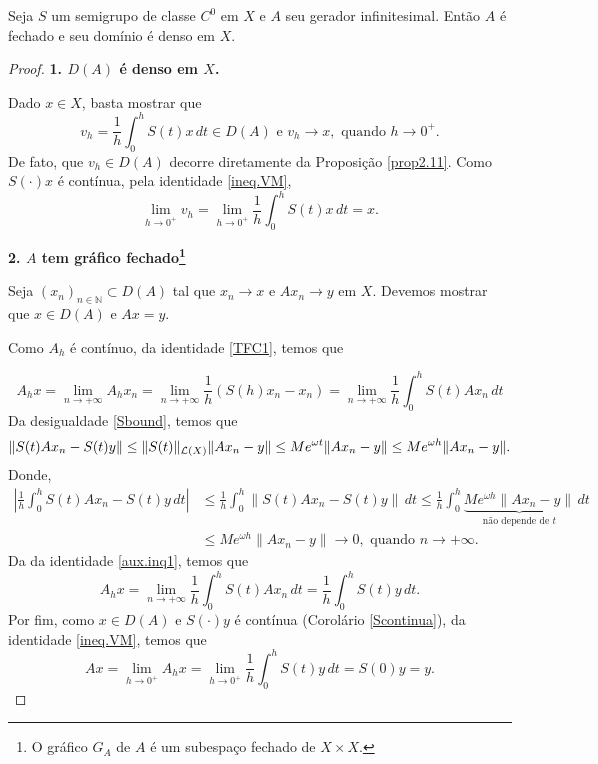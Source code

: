 \begin{proposition}\label{Afd}
Seja $S$ um semigrupo de classe $C^0$ em $X$ e $A$ seu gerador infinitesimal. Então $A$ é fechado e seu domínio é denso em $X$.
\end{proposition}
\begin{proof}
\noindent

\noindent\textbf{1. $D(A)$ é denso em $X$.}

Dado $x\in X$, basta mostrar que 
\[v_h=\frac{1}{h}\int_0^h S(t)x\,dt\in D(A) \text{ e } v_h\to x, \text{ quando } h\to 0^+.\]
De fato, que $v_h\in D(A)$ decorre diretamente da Proposição \ref{prop2.11}. Como $S(\cdot)x$ é contínua, pela identidade \eqref{ineq.VM}, 
\[\lim\limits_{h\to 0^+} v_h=\lim\limits_{h\to 0^+}\frac{1}{h}\int_0^h S(t)x\,dt=x.\]

\noindent\textbf{2. $A$ tem gráfico fechado\footnote{O gráfico $G_A$ de $A$ é um subespaço fechado de $X\times X$.}}

Seja $(x_n)_{n\in \mathbb{N}}\subset D(A)$ tal que $x_n\to x$ e $Ax_n\to y$ 
em  $X$. Devemos mostrar que $x\in D(A)$ e $Ax=y$.



Como $A_h$ é contínuo, da identidade \eqref{TFC1}, temos que

\begin{equation}\label{aux.inq1}
A_hx =\lim\limits_{n\to +\infty}A_hx_n
=\lim\limits_{n\to +\infty}\frac{1}{h}\left(S(h)x_n-x_n\right)  =\lim\limits_{n\to +\infty}\frac{1}{h}\int_0^h S(t)Ax_n\,dt
\end{equation}
Da desigualdade \eqref{Sbound}, temos que
\begin{equation*}
\|S(t)Ax_n-S(t)y\|\leq \|S(t)\|_{\mathcal{L}(X)}\|Ax_n-y\|\leq Me^{\omega t} \|Ax_n-y\|\leq Me^{\omega h}\|Ax_n-y\|.
\end{equation*}
Donde, 
\begin{align*}
\left|\frac{1}{h}\int_0^h S(t)Ax_n-S(t)y\,dt\right|& \leq 
\frac{1}{h}\int_0^h\|S(t)Ax_n-S(t)y\|\,dt  \leq \frac{1}{h}\int_0^h \underbrace{Me^{\omega h}\|Ax_n-y\|}_{\text{não depende de $t$}}\,dt \\
& \leq Me^{\omega h}\|Ax_n-y\|\to 0, \text{ quando } n\to +\infty. 
\end{align*}
Da da identidade \eqref{aux.inq1}, temos que
\begin{equation*}
A_hx=\lim\limits_{n\to +\infty}\frac{1}{h}\int_0^h S(t)Ax_n\,dt=
\frac{1}{h}\int_0^h S(t)y\,dt.
\end{equation*}
Por fim, como $x\in D(A)$ e $S(\cdot)y$ é contínua (Corolário \ref*{Scontinua}), da identidade \eqref{ineq.VM}, temos que
\[
Ax=\lim_{h \to 0^+} A_hx=\lim_{h \to 0^+} \frac{1}{h}\int_0^h S(t)y\,dt=S(0)y=y.
\]
\end{proof}

